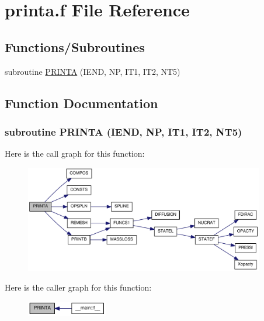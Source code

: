 \hypertarget{printa_8f}{
\section{printa.f File Reference}
\label{printa_8f}
}
\subsection*{Functions/Subroutines}
\begin{DoxyCompactItemize}
\item 
subroutine \hyperlink{printa_8f_a997190dd10f135334b9091735b7f77b8}{PRINTA} (IEND, NP, IT1, IT2, NT5)
\end{DoxyCompactItemize}


\subsection{Function Documentation}
\hypertarget{printa_8f_a997190dd10f135334b9091735b7f77b8}{
\subsubsection[{PRINTA}]{\setlength{\rightskip}{0pt plus 5cm}subroutine PRINTA (IEND, \/  NP, \/  IT1, \/  IT2, \/  NT5)}}
\label{printa_8f_a997190dd10f135334b9091735b7f77b8}


Here is the call graph for this function:\nopagebreak
\begin{figure}[H]
\begin{center}
\leavevmode
\includegraphics[width=297pt]{printa_8f_a997190dd10f135334b9091735b7f77b8_cgraph}
\end{center}
\end{figure}


Here is the caller graph for this function:\nopagebreak
\begin{figure}[H]
\begin{center}
\leavevmode
\includegraphics[width=100pt]{printa_8f_a997190dd10f135334b9091735b7f77b8_icgraph}
\end{center}
\end{figure}
